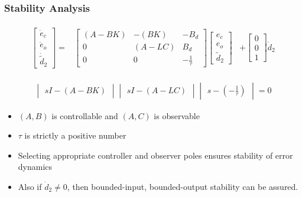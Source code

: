\documentclass[table,10pt,red]{beamer}	%
\begin{document}
\begin{frame}
\frametitle{Stability Analysis}

\begin{eqnarray}
\begin{aligned}
\begin{bmatrix}
\dot{e}_c \\
\dot{e}_o \\
\dot{\tilde{d}}_2
\end{bmatrix} =& 
\begin{bmatrix}
(A - BK) & -(BK) & -B_d \\
0 & (A - LC) & B_d \\
0 & 0 & -\frac{1}{\tau}
\end{bmatrix}
\begin{bmatrix}
e_c \\
e_o \\
\tilde{d}_2
\end{bmatrix}	
& + 
\begin{bmatrix}
0 \\
0 \\
1
\end{bmatrix} \dot{d}_2 \label{sr8}
\end{aligned}
\end{eqnarray}

\begin{eqnarray}
\begin{vmatrix}
sI - (A - BK)
\end{vmatrix}
\begin{vmatrix}
sI - (A - LC)
\end{vmatrix}
\begin{vmatrix}
s - (-\frac{1}{\tau})
\end{vmatrix} = 0 \label{sr9}
\end{eqnarray}

\begin{itemize}
	\item $(A, B)$ is controllable and $(A, C)$ is observable
	\item $\tau$ is strictly a positive number
	\item Selecting appropriate controller and observer poles ensures stability of error dynamics
	\item Also if $\dot{d}_2 \ne 0$, then bounded-input, bounded-output stability can be assured. 
\end{itemize}


\end{frame}


\end{document}
